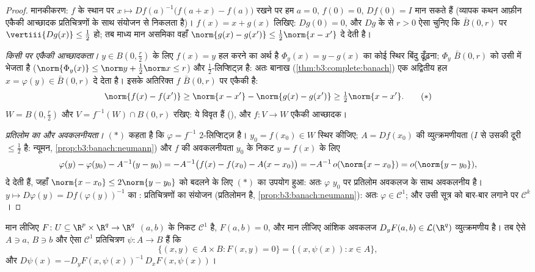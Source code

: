 \begin{proof}
मानकीकरण: $f$ के स्थान पर $x \mapsto Df(a)^{-1}\bigl(f(a +
x) - f(a)\bigr)$ रखने पर हम $a = 0$, $f(0) = 0$, $Df(0) =
I$ मान
सकते हैं (व्यापक कथन आफ़ीन एकैकी आच्छादक प्रतिचित्रणों के साथ
संयोजन से निकलता है)। $f(x) = x + g(x)$ लिखिए: $Dg(0) = 0$, और $Dg$ के  से
$r > 0$ ऐसा चुनिए कि $\bar B(0, r)$ पर $\vertiii{Dg(x)} \leq \frac12$ हो; तब माध्य मान असमिका वहाँ
$\norm{g(x) - g(x')} \leq \frac12
\norm{x - x'}$ दे देती है।

\emph{किसी  पर एकैकी आच्छादकता।} $y \in B(0,
\frac r2)$ के लिए $f(x) = y$ हल करने
का अर्थ है $\Phi_y(x) = y - g(x)$ का कोई स्थिर बिंदु ढूँढ़ना; $\Phi_y$ $\bar B(0, r)$ को उसी में
भेजता है ($\norm{\Phi_y(x)} \leq \norm y + \frac12\norm x \leq
r$) और $\frac12$-लिप्शिट्ज़ है: अतः बानाख (\cref{thm:b3:complete:banach}) एक
अद्वितीय हल $x = \varphi(y) \in \bar B(0,r)$ दे देता है। इसके अतिरिक्त $f$ $\bar B(0,r)$ पर एकैकी
है:
\[
\norm{f(x) - f(x')} \geq \norm{x - x'} - \norm{g(x) - g(x')}
\geq \tfrac12\norm{x - x'} .
\tag{$*$}
\]
$W = B(0, \frac r2)$ और $V = f^{-1}(W)\cap B(0, r)$ रखिए: ये विवृत हैं (), और $f \colon V \to W$ एकैकी आच्छादक।

\emph{प्रतिलोम का  और अवकलनीयता।} $(*)$ कहता है कि $\varphi = f^{-1}$
$2$-लिप्शिट्ज़ है। $y_0 = f(x_0)
\in W$ स्थिर कीजिए; $A = Df(x_0)$ की व्युत्क्रमणीयता
($I$ से उसकी दूरी $\leq \frac12$ है: न्यूमन, \cref{prop:b3:banach:neumann}) और $f$ की अवकलनीयता
$y_0$ के निकट $y = f(x)$ के लिए
\[
\varphi(y) - \varphi(y_0) - A^{-1}(y - y_0)
= -A^{-1}\bigl(f(x) - f(x_0) - A(x - x_0)\bigr)
= -A^{-1}\,o(\norm{x - x_0}) = o(\norm{y - y_0}),
\]
दे देती हैं, जहाँ $\norm{x - x_0} \leq 2\norm{y - y_0}$ को बदलने के लिए $(*)$ का उपयोग हुआ: अतः
$\varphi$ $y_0$ पर प्रतिलोम अवकलज के साथ अवकलनीय है। $y \mapsto D\varphi(y) =
Df(\varphi(y))^{-1}$ का :
 प्रतिचित्रणों का संयोजन (प्रतिलोमन  है, \cref{prop:b3:banach:neumann}): अतः
$\varphi \in \mathcal C^1$; और उसी सूत्र को बार-बार लगाने पर $\mathcal C^k$।
\end{proof}

\begin{theorem}[अंतर्निहित फलन प्रमेय]
\label{thm:b3:submanifolds:implicit}
मान लीजिए $F \colon U \subseteq \R^p\times\R^q \to \R^q$ $(a, b)$ के निकट $\mathcal C^1$ है, $F(a,b) = 0$, और मान लीजिए आंशिक
अवकलज $D_yF(a,b) \in \mathcal L(\R^q)$ व्युत्क्रमणीय है। तब ऐसे  $A \ni a$, $B \ni b$ और ऐसा
$\mathcal C^1$ प्रतिचित्रण $\psi \colon A \to B$ हैं कि
\[
\bigl\{(x, y)\in A\times B : F(x,y) = 0\bigr\}
= \{(x, \psi(x)) : x \in A\},
\]
और $D\psi(x) = -D_yF(x, \psi(x))^{-1}\,D_xF(x,
\psi(x))$।
\end{theorem}

